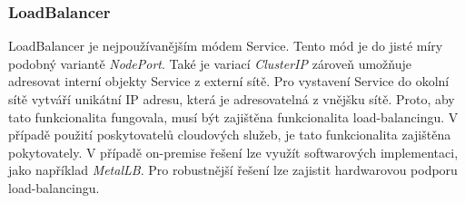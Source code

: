 \subsubsection{LoadBalancer}
LoadBalancer je nejpoužívanějším módem Service. \cite{poulton_2022_the} Tento mód je do jisté míry podobný variantě \textit{NodePort}. Také je variací \textit{ClusterIP} zároveň umožňuje adresovat interní objekty Service z externí sítě. Pro vystavení Service do okolní sítě vytváří unikátní IP adresu, která je adresovatelná z vnějšku sítě. Proto, aby tato funkcionalita fungovala, musí být zajištěna funkcionalita load-balancingu. V případě použití poskytovatelů cloudových služeb, je tato funkcionalita zajištěna pokytovately. V případě on-premise řešení lze využít softwarových implementaci, jako například \textit{MetalLB}. Pro robustnější řešení lze zajistit hardwarovou podporu load-balancingu. \cite{thekubernetesauthors_2023_service}



